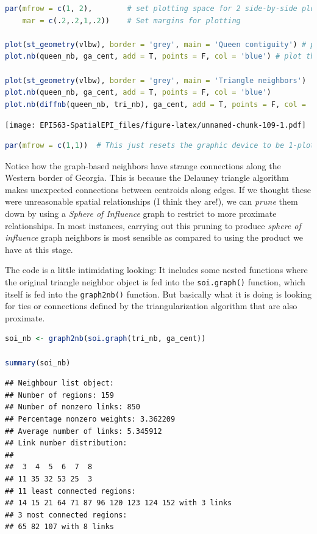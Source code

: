 \documentclass[
]{book}
\newcommand{\passthrough}[1]{#1}
\begin{document}
\begin{lstlisting}[language=R]
par(mfrow = c(1, 2),        # set plotting space for 2 side-by-side plots
    mar = c(.2,.2,1,.2))    # Set margins for plotting

plot(st_geometry(vlbw), border = 'grey', main = 'Queen contiguity') # plot the polygons
plot.nb(queen_nb, ga_cent, add = T, points = F, col = 'blue') # plot the Queen neighbor links

plot(st_geometry(vlbw), border = 'grey', main = 'Triangle neighbors')
plot.nb(queen_nb, ga_cent, add = T, points = F, col = 'blue')
plot.nb(diffnb(queen_nb, tri_nb), ga_cent, add = T, points = F, col = 'red')
\end{lstlisting}

\texttt{[image: EPI563-SpatialEPI\_files/figure-latex/unnamed-chunk-109-1.pdf]}

\begin{lstlisting}[language=R]
par(mfrow = c(1,1))  # This just resets the graphic device to be 1-plot per page
\end{lstlisting}

Notice how the graph-based neighbors have strange connections along the Western border of Georgia. This is because the Delauney triangle algorithm makes unexpected connections between centroids along edges. If we thought these were unreasonable spatial relationships (I think they are!), we can \emph{prune} them down by using a \emph{Sphere of Influence} graph to restrict to more proximate relationships. In most instances, carrying out this pruning to produce \emph{sphere of influence} graph neighbors is most sensible as compared to using the product we have at this stage.

The code is a little intimidating looking: It includes some nested functions where the original triangle neighbor object is fed into the \passthrough{\lstinline!soi.graph()!} function, which itself is fed into the \passthrough{\lstinline!graph2nb()!} function. But basically what it is doing is looking for ties or connections defined by the triangularization algorithm that are also proximate.

\begin{lstlisting}[language=R]
soi_nb <- graph2nb(soi.graph(tri_nb, ga_cent))

summary(soi_nb)
\end{lstlisting}

\begin{lstlisting}
## Neighbour list object:
## Number of regions: 159 
## Number of nonzero links: 850 
## Percentage nonzero weights: 3.362209 
## Average number of links: 5.345912 
## Link number distribution:
## 
##  3  4  5  6  7  8 
## 11 35 32 53 25  3 
## 11 least connected regions:
## 14 15 21 64 71 87 96 120 123 124 152 with 3 links
## 3 most connected regions:
## 65 82 107 with 8 links
\end{lstlisting}
\end{document}
